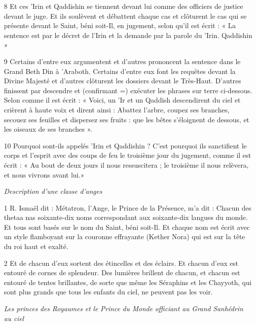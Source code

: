 \par 8 Et ces 'Irin et Qaddishin se tiennent devant lui comme des officiers de justice devant le juge. Et ils soulèvent et débattent chaque cas et clôturent le cas qui se présente devant le Saint, béni soit-Il, en jugement, selon qu'il est écrit : « La sentence est par le décret de l'Irin et la demande par la parole du 'Irin. Qaddishin »

\par 9 Certains d'entre eux argumentent et d'autres prononcent la sentence dans le Grand Beth Din à 'Araboth. Certains d'entre eux font les requêtes devant la Divine Majesté et d'autres clôturent les dossiers devant le Très-Haut. D'autres finissent par descendre et (confirmant =) exécuter les phrases sur terre ci-dessous. Selon comme il est écrit : « Voici, un 'Ir et un Qaddish descendirent du ciel et crièrent à haute voix et dirent ainsi : Abattez l'arbre, coupez ses branches, secouez ses feuilles et dispersez ses fruits : que les bêtes s'éloignent de dessous, et les oiseaux de ses branches ».

\par 10 Pourquoi sont-ils appelés 'Irin et Qaddishin ? C'est pourquoi ils sanctifient le corps et l'esprit avec des coups de feu le troisième jour du jugement, comme il est écrit : « Au bout de deux jours il nous ressuscitera ; le troisième il nous relèvera, et nous vivrons avant lui.»


\par \textit{Description d'une classe d'anges}

\par 1 R. Ismaël dit : Métatron, l'Ange, le Prince de la Présence, m'a dit : Chacun des thetaa nas soixante-dix noms correspondant aux soixante-dix langues du monde. Et tous sont basés sur le nom du Saint, béni soit-Il. Et chaque nom est écrit avec un style flamboyant sur la couronne effrayante (Kether Nora) qui est sur la tête du roi haut et exalté.

\par 2 Et de chacun d'eux sortent des étincelles et des éclairs. Et chacun d’eux est entouré de cornes de splendeur. Des lumières brillent de chacun, et chacun est entouré de tentes brillantes, de sorte que même les Séraphins et les Chayyoth, qui sont plus grands que tous les enfants du ciel, ne peuvent pas les voir.


\par \textit{Les princes des Royaumes et le Prince du Monde officiant au Grand Sanhédrin au ciel}

